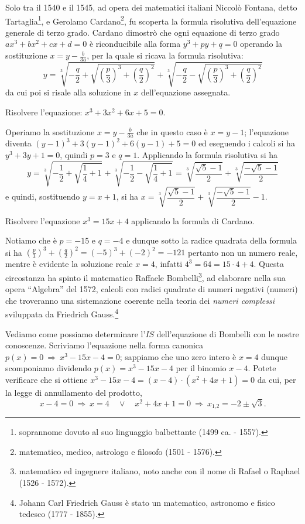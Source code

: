 Solo tra il 1540 e il 1545, ad opera dei matematici italiani Niccolò Fontana, detto Tartaglia\footnote{soprannome dovuto al suo linguaggio balbettante (1499 ca. - 1557).}, e Gerolamo Cardano\footnote{matematico, medico, astrologo e filosofo (1501 - 1576).}, fu scoperta la formula risolutiva dell'equazione generale di terzo grado.
Cardano dimostrò che ogni equazione di terzo grado $ax^3+bx^2+cx+d=0$ è riconducibile alla forma $y^3+py+q=0$ operando la sostituzione $x=y-\frac b{3a}$, per la quale si ricava la formula risolutiva: 
\[y=\sqrt[3]{-\frac q 2+\sqrt{\left(\frac p 3\right)^3+\left(\frac q 2\right)^2}}+\sqrt[3]{-\frac q 2-\sqrt{\left(\frac p 3\right)^3+\left(\frac q 2\right)^2}}\] 
da cui poi si risale alla soluzione in $x$ dell'equazione assegnata.
\begin{exrig}
\begin{esempio}
Risolvere l'equazione: $x^3+3x^2+6x+5=0$.

Operiamo la sostituzione $x=y-\frac b{3a}$ che in questo caso è $x=y-1$; l'equazione diventa $(y-1)^3+3(y-1)^2+6(y-1)+5=0$ ed eseguendo i calcoli si ha $y^3+3y+1=0$, quindi $p=3$ e $q=1$.
Applicando la formula risolutiva si ha 
\[y=\sqrt[3]{-\frac 1 2+\sqrt{\frac 1 4+1}}+\sqrt[3]{-\frac 1 2-\sqrt{\frac 1 4+1}}=\sqrt[3]{\frac{\sqrt 5-1} 2}+\sqrt[3]{\frac{-\sqrt 5-1} 2}\] 
e quindi, sostituendo $y=x+1$, si ha $x=\sqrt[3]{\dfrac{\sqrt 5-1} 2}+\sqrt[3]{\dfrac{-\sqrt 5-1} 2}-1$.
\end{esempio}

\begin{esempio}
Risolvere l'equazione $x^3=15x+4$ applicando la formula di Cardano.

Notiamo che è $p=-15$ e $q=-4$ e dunque sotto la radice quadrata della formula 
si ha $\left(\frac p 3\right)^3+\left(\frac q 2\right)^2=(-5)^3+(-2)^2=-121$ pertanto non un numero
reale, mentre è evidente la soluzione reale $x=4$, infatti $4^3=64=15\cdot 4+4$. Questa circostanza ha spinto il matematico Raffaele Bombelli\footnote{matematico ed ingegnere italiano, noto anche con il nome di Rafael o Raphael (1526 - 1572).}, ad elaborare nella sua opera ``Algebra'' del 1572, calcoli con radici quadrate di numeri negativi (numeri) che troveranno una sistemazione coerente nella teoria dei \emph{numeri complessi} sviluppata da Friedrich Gauss.\footnote{Johann Carl Friedrich Gauss è stato un matematico, astronomo e fisico tedesco (1777 - 1855).}

Vediamo come possiamo determinare l'$IS$ dell'equazione di Bombelli con le nostre conoscenze. Scriviamo l'equazione nella forma canonica $p(x)=0\:\Rightarrow\: x^3-15x-4=0$; sappiamo che uno zero intero è $x=4$ dunque scomponiamo dividendo $p(x)=x^3-15x-4$ per il binomio $x-4$. Potete verificare che si ottiene $x^3-15x-4=(x-4)\cdot (x^2+4x+1)=0$ da cui, per la legge di annullamento del prodotto, 
\[x-4=0\:\Rightarrow\: x=4\quad\vee\quad x^2+4x+1=0\:\Rightarrow\: x_{1\text{,}2}=-2\pm \sqrt 3.\]


\end{esempio}
\end{exrig}
